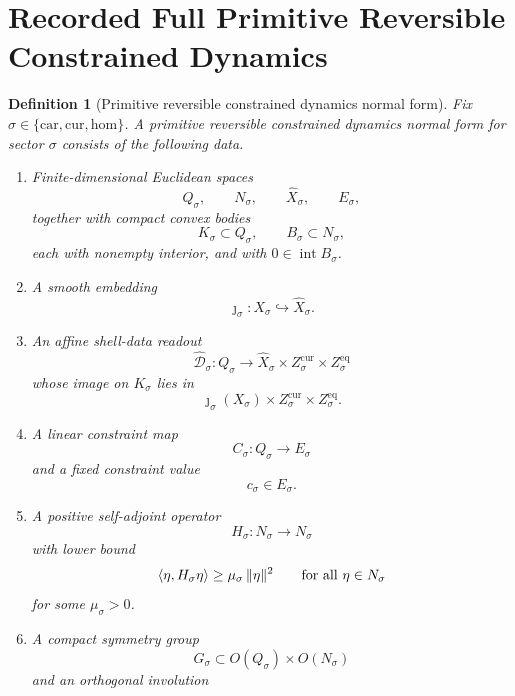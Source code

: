 \documentclass[11pt]{article}
\newcommand{\Car}{\mathrm{car}}
\newcommand{\Cur}{\mathrm{cur}}
\newcommand{\Hom}{\mathrm{hom}}
\newcommand{\CoordSpace}[1]{Q_{#1}}
\newcommand{\CoordBody}[1]{K_{#1}}
\newcommand{\NormalSpace}[1]{N_{#1}}
\newcommand{\NormalBody}[1]{B_{#1}}
\newcommand{\VisibleAffine}[1]{\widehat X_{#1}}
\newcommand{\AffineData}[1]{\widehat{\mathcal D}_{#1}}
\newcommand{\ConstraintTarget}[1]{E_{#1}}
\newcommand{\ConstraintMap}[1]{C_{#1}}
\newcommand{\ConstraintValue}[1]{c_{#1}}
\newcommand{\NormalOperator}[1]{H_{#1}}
\newcommand{\SymGroup}[1]{G_{#1}}
\newtheorem{definition}{Definition}
\begin{document}
\section{Recorded Full Primitive Reversible Constrained Dynamics}

\begin{definition}[Primitive reversible constrained dynamics normal form]
\label{def:full}
Fix \(\sigma\in\{\Car,\Cur,\Hom\}\). A \emph{primitive reversible constrained dynamics normal form} for sector \(\sigma\) consists of the following data.
\begin{enumerate}
    \item Finite-dimensional Euclidean spaces
    \[
    \CoordSpace{\sigma},
    \qquad
    \NormalSpace{\sigma},
    \qquad
    \VisibleAffine{\sigma},
    \qquad
    \ConstraintTarget{\sigma},
    \]
    together with compact convex bodies
    \[
    \CoordBody{\sigma}\subset\CoordSpace{\sigma},
    \qquad
    \NormalBody{\sigma}\subset\NormalSpace{\sigma},
    \]
    each with nonempty interior, and with \(0\in\operatorname{int}\NormalBody{\sigma}\).
    \item A smooth embedding
    \[
    \jmath_{\sigma}:X_{\sigma}\hookrightarrow \VisibleAffine{\sigma}.
    \]
    \item An affine shell-data readout
    \[
    \AffineData{\sigma}:\CoordSpace{\sigma}\to
    \VisibleAffine{\sigma}\times Z_{\sigma}^{\mathrm{cur}}\times Z_{\sigma}^{\mathrm{eq}}
    \]
    whose image on \(\CoordBody{\sigma}\) lies in
    \[
    \jmath_{\sigma}(X_{\sigma})\times Z_{\sigma}^{\mathrm{cur}}\times Z_{\sigma}^{\mathrm{eq}}.
    \]
    \item A linear constraint map
    \[
    \ConstraintMap{\sigma}:\CoordSpace{\sigma}\to \ConstraintTarget{\sigma}
    \]
    and a fixed constraint value
    \[
    \ConstraintValue{\sigma}\in\ConstraintTarget{\sigma}.
    \]
    \item A positive self-adjoint operator
    \[
    \NormalOperator{\sigma}:\NormalSpace{\sigma}\to\NormalSpace{\sigma}
    \]
    with lower bound
    \begin{equation}
    \ev{\eta,\NormalOperator{\sigma}\eta}\ge \mu_{\sigma}\,\|\eta\|^{2}
    \qquad
    \text{for all }\eta\in\NormalSpace{\sigma}
    \label{eq:fullgap}
    \end{equation}
    for some \(\mu_{\sigma}>0\).
    \item A compact symmetry group
    \[
    \SymGroup{\sigma}\subset O(\CoordSpace{\sigma})\times O(\NormalSpace{\sigma})
    \]
    and an orthogonal involution

\end{enumerate}
\end{definition}
\end{document}
